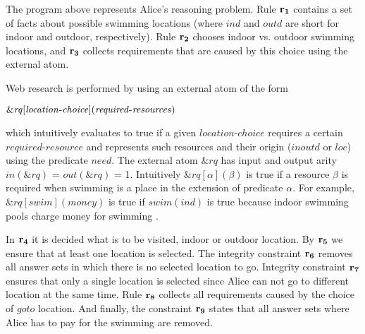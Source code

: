 \documentclass[a4paper, titlepage]{article}
\newcommand{\ext}[3]{\ensuremath{\&{\mathit{#1}}[#2](#3)}}
\newcommand\mycenterline[1]{\par\smallskip\centerline{#1} \smallskip}
\newcommand{\row}[1]{%
  \ensuremath{\color{black}\ensuremath{\mathbf{#1}} \color{black}}%
}
\begin{document}
The \hex{} program above represents Alice's reasoning 
problem. Rule $\row{r_1}$ contains a set of facts about possible 
swimming locations (where $\mathit{ind}$ and 
$\mathit{outd}$ are short for indoor and outdoor, 
respectively). Rule $\row{r_2}$ chooses indoor vs. outdoor 
swimming locations, and $\row{r_3}$ collects requirements that 
are caused by this choice using the external atom. 

Web research is performed by using an external atom of the 
form 
\mycenterline{$\ext{\mathit{rq}}{\mathit{location}$-$
\mathit{choice}}{\mathit{required}$-$\mathit{resources}}$}
which intuitively 
evaluates to true if a given $\mathit{location}$-$\mathit{choice}$ 
requires a certain $\mathit{required}$-$\mathit{resource}$ and 
represents such resources  and their origin 
($\mathit{inoutd}$ or $\mathit{loc}$) using the predicate 
$\mathit{need}$. The external atom $\mathit{\&rq}$ has 
input and output arity $\mathit{in(\&rq)}$ = 
$\mathit{out(\&rq)}$ = 1. Intuitively  $\ext{\mathit{rq}}
{\mathit{\alpha}}{\mathit{\beta}}$ is true if a resource 
$\beta$ is required when swimming is a place in the 
extension of predicate $\alpha$. For example, 
$\ext{\mathit{rq}}{\mathit{swim}}{\mathit{money}}$ is true 
if $\mathit{swim(ind)}$ is true because indoor swimming 
pools charge money for swimming \cite{efikrs2015}. 

In $\row{r_4}$ it is decided what is to be visited, indoor or 
outdoor location. By $\row{r_5}$ we ensure that at least one location is selected. The integrity constraint $\row{r_6}$ removes all answer sets in which there is no selected location to go. Integrity constraint $\row{r_7}$ ensures that only a single location is selected since Alice can not go to different location at the same time. Rule $\row{r_8}$ collects all requirements caused by 
the choice of $\mathit{goto}$ location. And finally, the constraint $\row{r_9}$ states that all answer sets where 
Alice has to pay for the swimming are removed.
\end{document}
